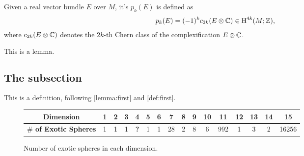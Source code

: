 \begin{definition}\label{def:pontryagin}
	Given a real vector bundle $E$ over $M$, it's  $p_k(E)$ is defined as
	\[
		p_k(E) = (-1)^k c_{2k}(E\otimes \mathbb{C}) \in \operatorname{H}^{4k}(M; \mathbb{Z}),
	\]
	where $c_{2k}(E\otimes \mathbb{C})$ denotes the $2k$-th Chern class of the complexification $E\otimes \mathbb{C}$.
\end{definition}

\begin{lemma}\label{lemma:first}
	This is a lemma.
\end{lemma}

\subsection{The subsection}

\begin{definition}\label{def:second}
	This is a definition, following \cref{lemma:first} and \cref{def:first}.
\end{definition}

\begin{figure}\label{fig:exotic_spheres_table}
	\centering
	\begin{tabular}{|c|c|c|c|c|c|c|c|c|c|c|c|c|c|c|c|}
		\hline
		\textbf{Dimension}
		 & 1 & 2 & 3  & 4                      & 5  & 6  & 7
		 & 8 & 9 & 10 & 11                     & 12 & 13 & 14 & 15    \\
		\hline
		\textbf{$\#$ of Exotic Spheres}
		 & 1 & 1 & 1  & \textbf{\color{red} ?} & 1  & 1  & 28
		 & 2 & 8 & 6  & 992                    & 1  & 3  & 2  & 16256 \\
		\hline
	\end{tabular}
	\caption{Number of exotic spheres in each dimension.}
\end{figure}

\lipsum[3-6]

